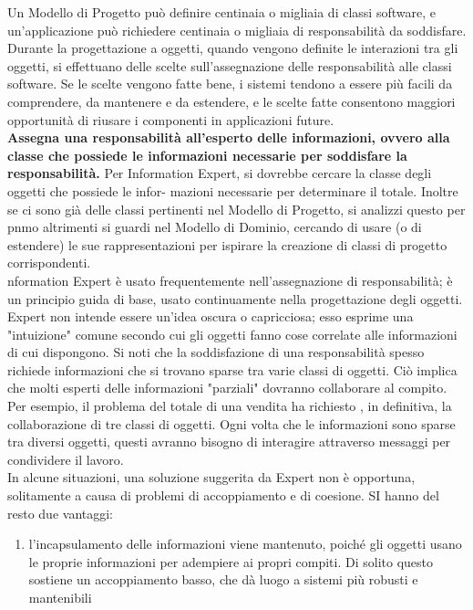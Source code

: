 \documentclass[a4paper,12pt, oneside]{book}
\begin{document}
\begin{enumerate}
\begin{center}
\end{center}
Un Modello di Progetto può definire centinaia o migliaia di classi software, e un'applicazione può richiedere centinaia o migliaia di responsabilità da soddisfare. Durante la
progettazione a oggetti, quando vengono definite le interazioni tra gli oggetti, si effettuano delle scelte sull'assegnazione delle responsabilità alle classi software. Se le scelte
vengono fatte bene, i sistemi tendono a essere più facili da comprendere, da mantenere
e da estendere, e le scelte fatte consentono maggiori opportunità di riusare i componenti
in applicazioni future.
\\\textbf{Assegna una responsabilità all'esperto delle informazioni, ovvero alla classe che possiede
le informazioni necessarie per soddisfare la responsabilità.}
Per Information Expert, si dovrebbe cercare la classe degli oggetti che possiede le infor-
mazioni necessarie per determinare il totale. Inoltre se ci sono già delle classi pertinenti nel Modello di Progetto, si analizzi questo per
pnmo altrimenti si guardi nel Modello di Dominio, cercando di usare (o di estendere) le
sue rappresentazioni per ispirare la creazione di classi di progetto corrispondenti.
\\nformation Expert è usato frequentemente nell'assegnazione di responsabilità; è un
principio guida di base, usato continuamente nella progettazione degli oggetti. Expert
non intende essere un'idea oscura o capricciosa; esso esprime una "intuizione" comune
secondo cui gli oggetti fanno cose correlate alle informazioni di cui dispongono.
Si noti che la soddisfazione di una responsabilità spesso richiede informazioni che si
trovano sparse tra varie classi di oggetti. Ciò implica che molti esperti delle informazioni
"parziali" dovranno collaborare al compito. Per esempio, il problema del totale di una
vendita ha richiesto , in definitiva, la collaborazione di tre classi di oggetti. Ogni volta
che le informazioni sono sparse tra diversi oggetti, questi avranno bisogno di interagire
attraverso messaggi per condividere il lavoro.\\ In alcune situazioni, una soluzione suggerita da Expert non è opportuna, solitamente
a causa di problemi di accoppiamento e di coesione. SI hanno del resto due vantaggi:
\begin{enumerate}
\item l'incapsulamento delle informazioni viene mantenuto, poiché gli oggetti usano le
proprie informazioni per adempiere ai propri compiti. Di solito questo sostiene un
accoppiamento basso, che dà luogo a sistemi più robusti e mantenibili

\end{enumerate}
\end{enumerate}
\end{document}
